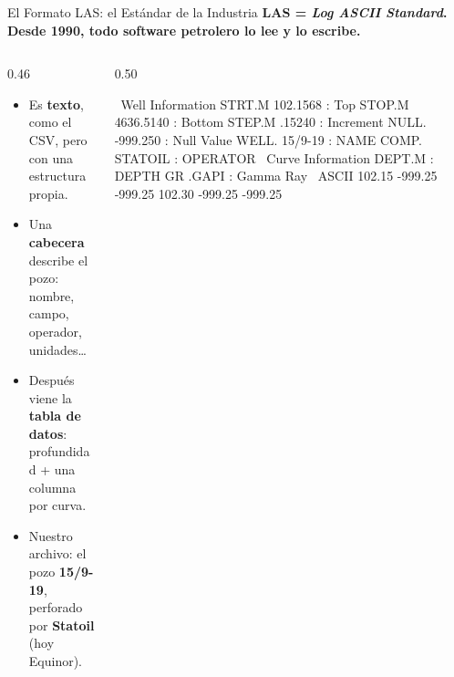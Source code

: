 \documentclass[aspectratio=169, 11pt]{beamer}
\begin{document}
\begin{frame}[fragile,shrink=18]{El Formato LAS: el Estándar de la Industria}
  \vspace{-4pt}
  {\small\color{arcaDark}\bfseries
    LAS = \textit{Log ASCII Standard}. Desde 1990, todo software petrolero lo lee y lo escribe.}

  \vspace{4pt}
  \begin{columns}[T]
    \begin{column}{0.46\textwidth}
      {\scriptsize\color{textMuted}
      \begin{itemize}\setlength{\itemsep}{5pt}
        \item[{\color{arcaRed}\scriptsize\faFile}]
          Es \textbf{texto}, como el CSV, pero con
          una estructura propia.
        \item[{\color{arcaRed}\scriptsize\faInfoCircle}]
          Una \textbf{cabecera} describe el pozo:
          nombre, campo, operador, unidades\ldots
        \item[{\color{arcaRed}\scriptsize\faTable}]
          Después viene la \textbf{tabla de datos}:
          profundidad + una columna por curva.
        \item[{\color{arcaRed}\scriptsize\faIndustry}]
          Nuestro archivo: el pozo \textbf{15/9-19},
          perforado por \textbf{Statoil} (hoy Equinor).
      \end{itemize}
      }
    \end{column}

    \begin{column}{0.50\textwidth}
      \begin{outputblock}[title={\small\faFile\hspace{6pt}15-9-19.LAS (por dentro)}]
~Well Information
STRT.M   102.1568 : Top
STOP.M  4636.5140 : Bottom
STEP.M     .15240 : Increment
NULL.    -999.250 : Null Value
WELL.     15/9-19 : NAME
COMP.     STATOIL : OPERATOR
~Curve Information
DEPT.M    : DEPTH
GR  .GAPI : Gamma Ray
~ASCII
 102.15  -999.25  -999.25
 102.30  -999.25  -999.25
      \end{outputblock}
    \end{column}
  \end{columns}
\end{frame}
\end{document}
